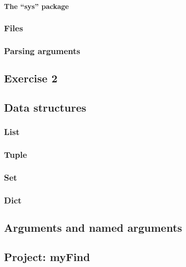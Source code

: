 \paragraph{The ``sys'' package}

\subsubsection{Files}
\subsubsection{Parsing arguments}

\subsection{Exercise 2}

\subsection{Data structures}
\subsubsection{List}
\subsubsection{Tuple}
\subsubsection{Set}
\subsubsection{Dict}

\subsection{Arguments and named arguments}

\subsection{Project: myFind}
